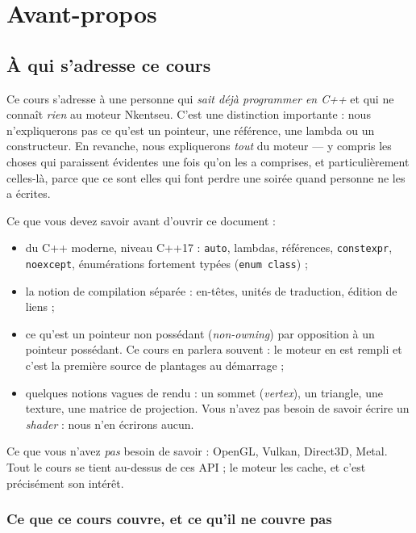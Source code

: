 \chapter{Avant-propos}

\section{À qui s'adresse ce cours}

Ce cours s'adresse à une personne qui \emph{sait déjà programmer en C++} et qui
ne connaît \emph{rien} au moteur Nkentseu. C'est une distinction importante :
nous n'expliquerons pas ce qu'est un pointeur, une référence, une lambda ou un
constructeur. En revanche, nous expliquerons \emph{tout} du moteur — y compris
les choses qui paraissent évidentes une fois qu'on les a comprises, et
particulièrement celles-là, parce que ce sont elles qui font perdre une soirée
quand personne ne les a écrites.

Ce que vous devez savoir avant d'ouvrir ce document :

\begin{itemize}
  \item du C++ moderne, niveau C++17 : \texttt{auto}, lambdas, références,
        \texttt{constexpr}, \texttt{noexcept}, énumérations fortement typées
        (\texttt{enum class}) ;
  \item la notion de compilation séparée : en-têtes, unités de traduction,
        édition de liens ;
  \item ce qu'est un pointeur non possédant (\emph{non-owning}) par opposition à
        un pointeur possédant. Ce cours en parlera souvent : le moteur en est
        rempli et c'est la première source de plantages au démarrage ;
  \item quelques notions vagues de rendu : un sommet (\emph{vertex}), un
        triangle, une texture, une matrice de projection. Vous n'avez pas besoin
        de savoir écrire un \emph{shader} : nous n'en écrirons aucun.
\end{itemize}

Ce que vous n'avez \emph{pas} besoin de savoir : OpenGL, Vulkan, Direct3D,
Metal. Tout le cours se tient au-dessus de ces API ; le moteur les cache, et
c'est précisément son intérêt.

\subsection{Ce que ce cours couvre, et ce qu'il ne couvre pas}

